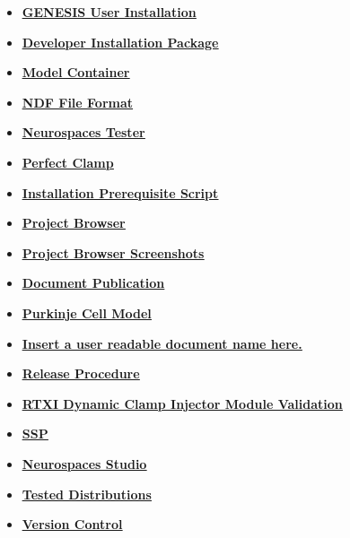 \documentclass[12pt]{article}
\begin{document}
\begin{itemize}
\item \href{../installation-user/installation-user.pdf}{\bf \underline{GENESIS User Installation}}

\item \href{../installer-package/installer-package.pdf}{\bf \underline{Developer Installation Package}}

\item \href{../model-container/model-container.pdf}{\bf \underline{Model Container}}

\item \href{../ndf-file-format/ndf-file-format.pdf}{\bf \underline{NDF File Format}}

\item \href{../neurospaces-tester/neurospaces-tester.pdf}{\bf \underline{Neurospaces Tester}}

\item \href{../pclamp/pclamp.pdf}{\bf \underline{Perfect Clamp}}

\item \href{../prerequisite-script/prerequisite-script.pdf}{\bf \underline{Installation Prerequisite Script}}

\item \href{../project-browser/project-browser.pdf}{\bf \underline{Project Browser}}

\item \href{../project-browser-screenshots/project-browser-screenshots.pdf}{\bf \underline{Project Browser Screenshots}}

\item \href{../publication/publication.pdf}{\bf \underline{Document Publication}}

\item \href{../purkinje-cell-model/purkinje-cell-model.pdf}{\bf \underline{Purkinje Cell Model}}

\item \href{../release-expand/release-expand.pdf}{\bf \underline{Insert a user readable document name here.}}

\item \href{../release-procedure/release-procedure.pdf}{\bf \underline{Release Procedure}}

\item \href{../rtxi-injector-validation/rtxi-injector-validation.pdf}{\bf \underline{RTXI Dynamic Clamp Injector Module Validation}}

\item \href{../ssp/ssp.pdf}{\bf \underline{SSP}}

\item \href{../studio/studio.pdf}{\bf \underline{Neurospaces Studio}}

\item \href{../tested-distributions/tested-distributions.pdf}{\bf \underline{Tested Distributions}}

\item \href{../version-control/version-control.pdf}{\bf \underline{Version Control}}


\end{itemize}

\end{document}
